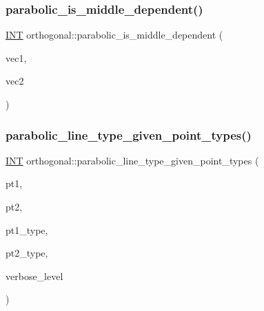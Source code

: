\mbox{\label{classorthogonal_a750ba345c730b319d4cc9d430cd092d3}} 
\subsubsection{\texorpdfstring{parabolic\+\_\+is\+\_\+middle\+\_\+dependent()}{parabolic\_is\_middle\_dependent()}}
{\footnotesize\ttfamily \mbox{\hyperlink{galois_8h_a09fddde158a3a20bd2dcadb609de11dc}{I\+NT}} orthogonal\+::parabolic\+\_\+is\+\_\+middle\+\_\+dependent (\begin{DoxyParamCaption}\item[{\mbox{\hyperlink{galois_8h_a09fddde158a3a20bd2dcadb609de11dc}{I\+NT}} $\ast$}]{vec1,  }\item[{\mbox{\hyperlink{galois_8h_a09fddde158a3a20bd2dcadb609de11dc}{I\+NT}} $\ast$}]{vec2 }\end{DoxyParamCaption})}

\mbox{\label{classorthogonal_af1894e9b4951ea3b58fafaec8e1314d4}} 
\subsubsection{\texorpdfstring{parabolic\+\_\+line\+\_\+type\+\_\+given\+\_\+point\+\_\+types()}{parabolic\_line\_type\_given\_point\_types()}}
{\footnotesize\ttfamily \mbox{\hyperlink{galois_8h_a09fddde158a3a20bd2dcadb609de11dc}{I\+NT}} orthogonal\+::parabolic\+\_\+line\+\_\+type\+\_\+given\+\_\+point\+\_\+types (\begin{DoxyParamCaption}\item[{\mbox{\hyperlink{galois_8h_a09fddde158a3a20bd2dcadb609de11dc}{I\+NT}}}]{pt1,  }\item[{\mbox{\hyperlink{galois_8h_a09fddde158a3a20bd2dcadb609de11dc}{I\+NT}}}]{pt2,  }\item[{\mbox{\hyperlink{galois_8h_a09fddde158a3a20bd2dcadb609de11dc}{I\+NT}}}]{pt1\+\_\+type,  }\item[{\mbox{\hyperlink{galois_8h_a09fddde158a3a20bd2dcadb609de11dc}{I\+NT}}}]{pt2\+\_\+type,  }\item[{\mbox{\hyperlink{galois_8h_a09fddde158a3a20bd2dcadb609de11dc}{I\+NT}}}]{verbose\+\_\+level }\end{DoxyParamCaption})}


